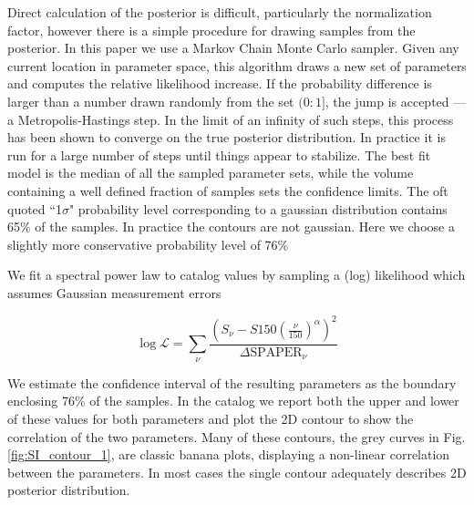 \documentclass[preprint]{aastex}
\newcommand{\logL}{\log\mathcal{L}}
\begin{document}
Direct calculation of the posterior is difficult, particularly the
normalization factor, however there is a simple procedure for drawing samples
from the posterior. In this paper we use a Markov Chain Monte Carlo sampler.
Given any current location in parameter space, this algorithm draws a new set
of parameters and computes the relative likelihood increase. If the probability
difference is larger than a number drawn randomly from the set $(0:1]$, the
jump is accepted ---a Metropolis-Hastings step. In the limit of an infinity of
such steps, this process has been shown to converge on the true posterior
distribution.  In practice it is run for a large number of steps until things
appear to stabilize. The best fit model is the median of all the sampled
parameter sets, while the volume containing a well defined fraction of samples
sets the confidence limits.  The oft quoted ``1$\sigma$" probability level
corresponding to a gaussian distribution contains 65\% of the samples. In
practice the contours are not gaussian. Here we choose a slightly more
conservative probability level of 76\% 

We fit a spectral power law to catalog values by sampling
a (log) likelihood which assumes Gaussian measurement errors

\[
\logL = \sum_\nu{\frac{\left(S_\nu - S150\left(\frac{\nu}{150}\right)^\alpha\right)^2}{\Delta \textrm{SPAPER}_\nu}} \label{eq:catlogL}
\]

We estimate the confidence interval of the resulting parameters as the boundary
enclosing 76\% of the samples. In the catalog we report both the upper and
lower of these values for both parameters and plot the 2D contour to show the
correlation of the two parameters. Many of these contours, the grey curves in
Fig. \ref{fig:SI_contour_1}, are classic banana plots, displaying a non-linear
correlation between the parameters.    In most cases the single contour
adequately describes 2D posterior distribution.
\end{document}
